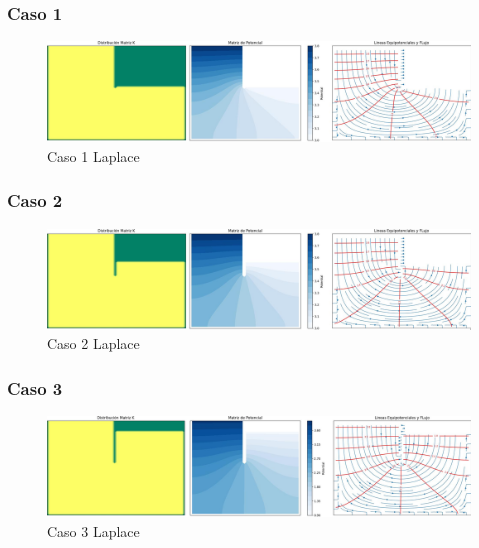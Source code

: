 \subsubsection{Caso 1}

\begin{figure}[H]
    \centering
    \includegraphics[width=\textwidth]{GRAFICOS/laplace_caso_1.jpg}
    \caption{Caso 1 Laplace}
\end{figure}

\subsubsection{Caso 2}

\begin{figure}[H]
    \centering
    \includegraphics[width=\textwidth]{GRAFICOS/laplace_caso_2.jpg}
    \caption{Caso 2 Laplace}
\end{figure}

\subsubsection{Caso 3}

\begin{figure}[H]
    \centering
    \includegraphics[width=\textwidth]{GRAFICOS/laplace_caso_3.jpg}
    \caption{Caso 3 Laplace}
\end{figure}

